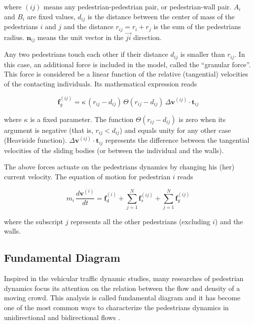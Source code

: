 where $(ij)$ means any pedestrian-pedestrian pair, or pedestrian-wall 
pair. $A_i$ and $B_i$ are fixed values, $d_{ij}$ is the distance between  the 
center of mass of the pedestrians $i$ and $j$ and the distance $r_{ij}=r_i+r_j$ 
is the sum of the pedestrians radius. $\mathbf{n}_{ij}$ means the unit vector in 
the $\vec{ji}$ direction.

Any two pedestrians touch each other if their distance $d_{ij}$ is smaller than 
$r_{ij}$.  In this case, an additional force is included in the model, called 
the ``granular force''. This force is considered be a linear function of the 
relative (tangential) velocities of the contacting individuals. Its mathematical 
expression reads 

\begin{equation}
        \mathbf{f}_g^{(ij)} = 
\kappa\,(r_{ij}-d_{ij})\,\Theta(r_{ij}-d_{ij})\,\Delta
\mathbf{v}^{(ij)}\cdot\mathbf{t}_{ij} 
        \label{granular}
\end{equation}

where $\kappa$ is a fixed parameter. The function 
$\Theta(r_{ij}-d_{ij})$ is zero when its argument is negative (that is, 
$r_{ij}<d_{ij}$) and equals unity for any other case (Heaviside function). 
$\Delta\mathbf{v}^{(ij)}\cdot\mathbf{t}_{ij}$ represents the difference between 
the tangential velocities of the sliding bodies (or between the individual and 
the walls).   

The above forces actuate on the pedestrians dynamics by changing his (her) 
current velocity. The equation of motion for pedestrian $i$ reads

\begin{equation}
m_i\,\displaystyle\frac{d\mathbf{v}^{(i)}}{dt}=\mathbf{f}_d^{(i)}
+\displaystyle\sum_{j=1}^{N}\displaystyle\mathbf{f}_s^{(ij)}
+\displaystyle\sum_ {
j=1}^{N}\mathbf{f}_g^{(ij)}\label{eq_mov}
\end{equation}

where the subscript $j$ represents all the other pedestrians 
(excluding $i$) and the walls. 

\subsection{\label{fundamental-diagram} Fundamental Diagram}

Inspired in the vehicular traffic dynamic studies, many researches of pedestrian dynamics focus its attention on the relation between the flow and density of a moving crowd. This analysis is called fundamental diagram and it has become one of the most common ways to characterize the pedestrians dynamics in unidirectional and bidirectional flows \cite{fruin1,mori1,polus1,seyfried1,jelic1}. 

